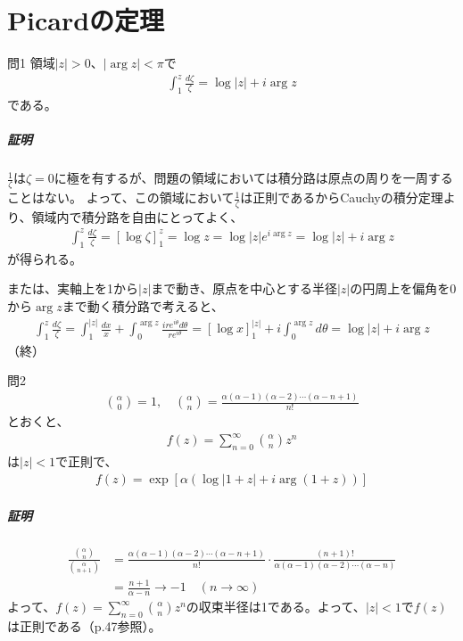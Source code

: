 \chapter{Picardの定理}%

\begin{mysimplebox}{問1}
    領域$|z|>0$、$|\arg z|<\pi$で
    \begin{align*}
        \int_{1}^{z}\frac{d\zeta}{\zeta}=\log|z|+i\arg z
    \end{align*}
    である。
\end{mysimplebox}
\paragraph{証明}
$\frac{1}{\zeta}$は$\zeta=0$に極を有するが、問題の領域においては積分路は原点の周りを一周することはない。
よって、この領域において$\frac{1}{\zeta}$は正則であるからCauchyの積分定理より、領域内で積分路を自由にとってよく、
\begin{align*}
    \int_{1}^{z}\frac{d\zeta}{\zeta}
    =\left[\log\zeta\right]_1^{z}
    =\log z
    =\log |z|e^{i\arg z}
    =\log |z|+i\arg z
\end{align*}
が得られる。

または、実軸上を1から$|z|$まで動き、原点を中心とする半径$|z|$の円周上を偏角を0から$\arg z$まで動く積分路で考えると、
\begin{align*}
    \int_{1}^{z}\frac{d\zeta}{\zeta}
    =\int_{1}^{|z|}\frac{dx}{x}
    +\int_{0}^{\arg z}\frac{ire^{i\theta}d\theta}{re^{i\theta}}
    =\left[\log x\right]_1^{|z|}
    +i\int_{0}^{\arg z}d\theta
    =\log|z|+i\arg z
\end{align*}
（終）

\newpage
\begin{mysimplebox}{問2}
    \begin{align*}
        \binom{\alpha}{0}=1,\quad
        \binom{\alpha}{n}
        =\frac{\alpha(\alpha-1)(\alpha-2)\cdots(\alpha-n+1)}{n!}
    \end{align*}
    とおくと、
    \begin{align*}
        f(z)=\sum_{n=0}^{\infty}\binom{\alpha}{n}z^n
    \end{align*}
    は$|z|<1$で正則で、
    \begin{align*}
        f(z)=\exp[\alpha(\log|1+z|+i\arg(1+z))]
    \end{align*}
\end{mysimplebox}
\paragraph{証明}
\begin{align*}
    \frac{\binom{\alpha}{n}}{\binom{\alpha}{n+1}}
    &=\frac{\alpha(\alpha-1)(\alpha-2)\cdots(\alpha-n+1)}{n!}\cdot
    \frac{(n+1)!}{\alpha(\alpha-1)(\alpha-2)\cdots(\alpha-n)}\\
    &=\frac{n+1}{\alpha-n}
    \longrightarrow -1\quad(n\longrightarrow\infty)
\end{align*}
よって、$f(z)=\sum_{n=0}^{\infty}\binom{\alpha}{n}z^n$の収束半径は1である。よって、$|z|<1$で$f(z)$は正則である（p.47参照）。

